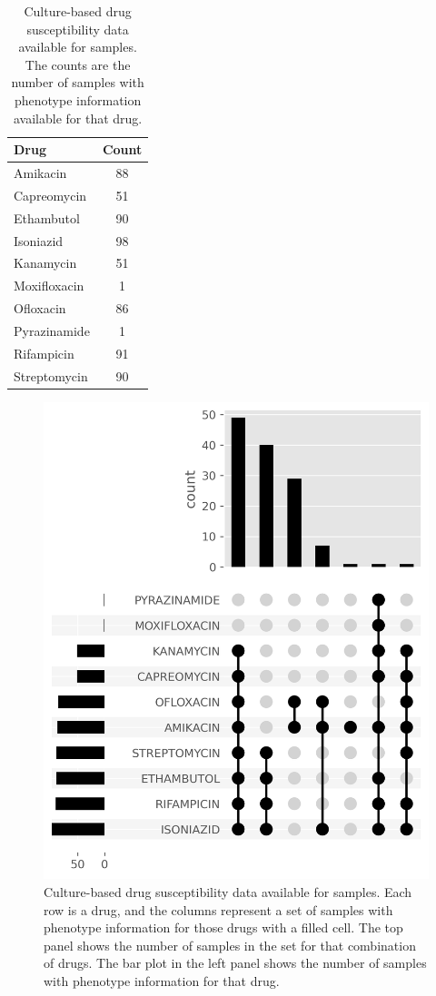 \begin{table}
\centering
\begin{tabular}{|l|c|}
\hline
Drug         & Count \\ \hline
Amikacin     & 88    \\ \hline
Capreomycin  & 51    \\ \hline
Ethambutol   & 90    \\ \hline
Isoniazid    & 98    \\ \hline
Kanamycin    & 51    \\ \hline
Moxifloxacin & 1     \\ \hline
Ofloxacin    & 86    \\ \hline
Pyrazinamide & 1     \\ \hline
Rifampicin   & 91    \\ \hline
Streptomycin & 90    \\ \hline
\end{tabular}
\caption{Culture-based drug susceptibility data available for samples. The counts are the number of samples with phenotype information available for that drug.}
\label{tab:available-dst}
\end{table}

\begin{figure}
\begin{center}
\includegraphics[width=0.90\columnwidth]{Chapter3/Figs/available_dst.png}
\caption{{Culture-based drug susceptibility data available for samples. Each row is a drug, and the columns represent a set of samples with phenotype information for those drugs with a filled cell. The top panel shows the number of samples in the set for that combination of drugs. The bar plot in the left panel shows the number of samples with phenotype information for that drug.
{\label{fig:available-dst}}
}}
\end{center}
\end{figure}
